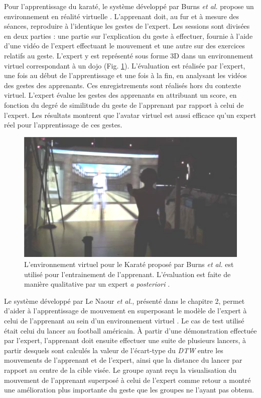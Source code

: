 Pour l'apprentissage du karaté, le système développé par Burns \textit{et al.} propose un environnement en réalité virtuelle \parencite{Burns2011Uvh}. L'apprenant doit, au fur et à mesure des séances, reproduire à l'identique les gestes de l'expert. Les sessions sont divisées en deux parties : une partie sur l'explication du geste à effectuer, fournie à l'aide d'une vidéo de l'expert effectuant le mouvement et une autre sur des exercices relatifs au geste. L'expert y est représenté sous forme 3D dans un environnement virtuel correspondant à un dojo (Fig. \ref{fig:Burns_karate}). L'évaluation est réalisée par l'expert, une fois au début de l'apprentissage et une fois à la fin, en analysant les vidéos des gestes des apprenants. Ces enregistrements sont réalisés hors du contexte virtuel. L'expert évalue les gestes des apprenants en attribuant un score, en fonction du degré de similitude du geste de l'apprenant par rapport à celui de l'expert. Les résultats montrent que l'avatar virtuel est aussi efficace qu'un expert réel pour l'apprentissage de ces gestes.

\begin{figure}
    \centering
    \includegraphics[width=\textwidth]{pictures/Burns_karate.png}
    \caption[Environnement virtuel pour l'apprentissage du karaté \parencite{Burns2011Uvh}]{L'environnement virtuel pour le Karaté proposé par Burns \textit{et al.} est utilisé pour l'entrainement de l'apprenant. L'évaluation est faite de manière qualitative par un expert \textit{a posteriori} \parencite{Burns2011Uvh}.}
    \label{fig:Burns_karate}
\end{figure}

Le système développé par Le Naour \textit{et al.}, présenté dans le chapitre 2, permet d'aider à l'apprentissage de mouvement en superposant le modèle de l'expert à celui de l'apprenant au sein d'un environnement virtuel \parencite{LeNaour2019S3V}. Le cas de test utilisé était celui du lancer au football américain. À partir d'une démonstration effectuée par l'expert, l'apprenant doit ensuite effectuer une suite de plusieurs lancers, à partir desquels sont calculés la valeur de l'écart-type du \textit{DTW} entre les mouvements de l'apprenant et de l'expert, ainsi que la distance du lancer par rapport au centre de la cible visée. Le groupe ayant reçu la visualisation du mouvement de l'apprenant superposé à celui de l'expert comme retour a montré une amélioration plus importante du geste que les groupes ne l'ayant pas obtenu.

